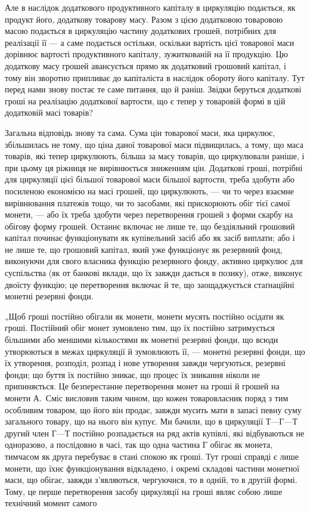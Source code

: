 
Але в наслідок додаткового продуктивного капіталу в циркуляцію
подається, як продукт його, додаткову товарову масу. Разом з цією
додатковою товаровою масою подається в циркуляцію частину додаткових
грошей, потрібних для реалізації її — а саме подається остільки, оскільки
вартість цієї товарової маси дорівнює вартості продуктивного капіталу,
зужиткованій на її продукцію. Цю додаткову масу грошей авансується
прямо як додатковий грошовий капітал, і тому він зворотно припливає
до капіталіста в наслідок обороту його капіталу. Тут перед нами знову
постає те саме питання, що й раніш. Звідки беруться додаткові гроші на
реалізацію додаткової вартости, що є тепер у товаровій формі в цій
додатковій масі товарів?

Загальна відповідь знову та сама. Сума цін товарової маси, яка циркулює,
збільшилась не тому, що ціна даної товарової маси підвищилась,
а тому, що маса товарів, які тепер циркулюють, більша за масу товарів,
що циркулювали раніше, і при цьому ця ріжниця не вирівнюється зниженням
цін. Додаткові гроші, потрібні для циркуляції цієї більшої товарової
маси більшої вартости, треба здобути або посиленою економією на
масі грошей, що циркулюють, — чи то через взаємне вирівнювання платежів
тощо, чи то засобами, які прискорюють обіг тієї самої монети, —
або їх треба здобути через перетворення грошей з форми скарбу на
обігову форму грошей. Останнє включає не лише те, що бездіяльний
грошовий капітал починає функціонувати як купівельний засіб
або як засіб виплати; або і не лише те, що грошовий капітал, який уже
функціонує як резервний фонд, виконуючи для свого власника функцію
резервного фонду, активно циркулює для суспільства (як от банкові
вклади, що їх завжди дається в позику), отже, виконує двоїсту функцію;
це перетворення включає й те, що заощаджується стаґнаційні монетні
резервні фонди.

„Щоб гроші постійно обігали як монети, монети мусять постійно
осідати як гроші. Постійний обіг монет зумовлено тим, що їх постійно
затримується більшими або меншими кількостями як монетні резервні
фонди, що всюди утворюються в межах циркуляції й зумовлюють її, —
монетні резервні фонди, що їх утворення, розподіл, розпад і нове утворення
завжди чергуються, резервні фонди; що буття їх постійно зникає,
що процес їх зникання ніколи не припиняється. Це безперестанне перетворення
монет на гроші й грошей на монети А.~Сміс висловив таким
чином, що кожен товаровласник поряд з тим особливим товаром, що
його він продає, завжди мусить мати в запасі певну суму загального
товару, що на нього він купує. Ми бачили, що в циркуляції $Т — Г — Т$
другий член $Г — Т$ постійно розпадається на ряд актів купівлі, які відбуваються
не одноразово, а послідовно в часі, так що одна частина $Г$
обігає як монета, тимчасом як друга перебуває в стані спокою як гроші.
Тут гроші справді є лише монети, що їхнє функціонування відкладено,
і окремі складові частини монетної маси, що обігає, завжди з’являються,
чергуючися, то в одній, то в другій формі. Тому, це перше перетворення
засобу циркуляції на гроші являє собою лише технічний момент самого
\parbreak{}  %
